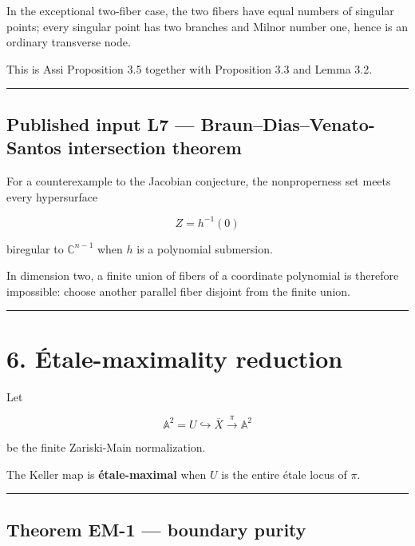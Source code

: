 In the exceptional two-fiber case, the two fibers have equal numbers of
singular points; every singular point has two branches and Milnor number
one, hence is an ordinary transverse node.

This is Assi Proposition 3.5 together with Proposition 3.3 and Lemma
3.2.

\begin{center}\rule{0.5\linewidth}{0.5pt}\end{center}

\subsection{Published input L7 --- Braun--Dias--Venato-Santos
intersection
theorem}\label{published-input-l7-braundiasvenato-santos-intersection-theorem}

For a counterexample to the Jacobian conjecture, the nonproperness set
meets every hypersurface

\[
Z=h^{-1}(0)
\]

biregular to \(\mathbb C^{n-1}\) when \(h\) is a polynomial submersion.

In dimension two, a finite union of fibers of a coordinate polynomial is
therefore impossible: choose another parallel fiber disjoint from the
finite union.

\begin{center}\rule{0.5\linewidth}{0.5pt}\end{center}

\section{6. Étale-maximality
reduction}\label{uxe9tale-maximality-reduction}

Let

\[
\mathbb A^2=U\hookrightarrow\overline X
\xrightarrow{\pi}\mathbb A^2
\]

be the finite Zariski-Main normalization.

The Keller map is \textbf{étale-maximal} when \(U\) is the entire étale
locus of \(\pi\).

\begin{center}\rule{0.5\linewidth}{0.5pt}\end{center}

\subsection{Theorem EM-1 --- boundary
purity}\label{theorem-em-1-boundary-purity}

